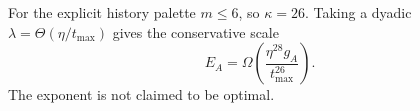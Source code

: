For the explicit history palette \(m\le6\), so \(\kappa=26\).  Taking a
dyadic \(\lambda=\Theta(\eta/t_{\max})\) gives the conservative scale
\begin{equation}
\label{eq:weighted-gap}
E_A=\Omega\!\left(\frac{\eta^{28}g_A}{t_{\max}^{26}}\right).
\end{equation}
The exponent is not claimed to be optimal.
